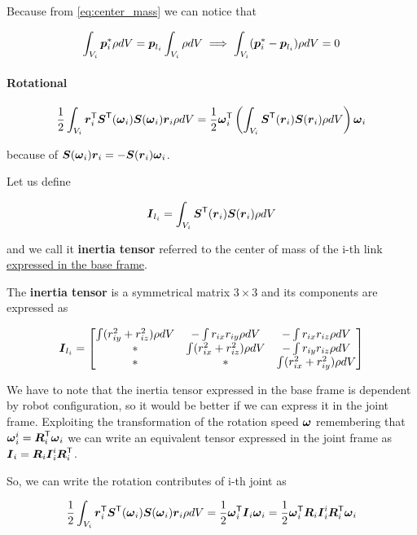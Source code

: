 Because from \autoref{eq:center_mass} we can notice that

\[
	\int_{V_i} \boldsymbol{p}_i^* \rho dV = \boldsymbol{p}_{l_i} \int_{V_i} \rho dV
	\implies
	\int_{V_i} (\boldsymbol{p}_i^* - \boldsymbol{p}_{l_i}) \rho dV = 0
\]

\paragraph{Rotational}

\[
	\frac{1}{2} \int_{V_i} \boldsymbol{r}_i^{\mathsf{T}} \boldsymbol{S}^{\mathsf{T}}(\boldsymbol{\omega}_i) \boldsymbol{S}(\boldsymbol{\omega}_i) \boldsymbol{r}_i \rho dV =
	\frac{1}{2} \boldsymbol{\omega}_i^{\mathsf{T}} \left( \int_{V_i} \boldsymbol{S}^{\mathsf{T}}(\boldsymbol{r}_i) \boldsymbol{S}(\boldsymbol{r}_i) \rho dV \right) \boldsymbol{\omega}_i
\]

because of $\boldsymbol{S}(\boldsymbol{\omega}_i) \boldsymbol{r}_i = - \boldsymbol{S}(\boldsymbol{r}_i)\boldsymbol{\omega}_i$.

Let us define

\[ \boldsymbol{I}_{l_i} = \int_{V_i} \boldsymbol{S}^{\mathsf{T}}(\boldsymbol{r}_i) \boldsymbol{S}(\boldsymbol{r}_i) \rho dV \]

and we call it \textbf{inertia tensor} referred to the center of mass of the i-th link \underline{expressed in the base frame}.

The \textbf{inertia tensor} is a symmetrical matrix $3 \times 3$ and its components are expressed as

\[
	\boldsymbol{I}_{l_i} =
	\begin{bmatrix}
		\int (r_{iy}^2 + r_{iz}^2) \rho dV & - \int r_{ix}r_{iy} \rho dV & - \int r_{ix}r_{iz} \rho dV \\
		* & \int (r_{ix}^2 + r_{iz}^2) \rho dV & - \int r_{iy}r_{iz} \rho dV \\
		* & * & \int (r_{ix}^2 + r_{iy}^2) \rho dV
	\end{bmatrix}
\]

We have to note that the inertia tensor expressed in the base frame is dependent by robot configuration, so it would be better if we can express it in the joint frame.
Exploiting the transformation of the rotation speed $\boldsymbol{\omega}$ remembering that $\boldsymbol{\omega}_i^i = \boldsymbol{R}_i^{\mathsf{T}}\boldsymbol{\omega}_i$ we can write an equivalent tensor expressed in the joint frame as $\boldsymbol{I}_i=\boldsymbol{R}_i \boldsymbol{I}_i^i \boldsymbol{R}_i^{\mathsf{T}}$.

So, we can write the rotation contributes of i-th joint as

\[
	\frac{1}{2} \int_{V_i} \boldsymbol{r}_i^{\mathsf{T}} \boldsymbol{S}^{\mathsf{T}}(\boldsymbol{\omega}_i) \boldsymbol{S}(\boldsymbol{\omega}_i) \boldsymbol{r}_i \rho dV =
	\frac{1}{2} \boldsymbol{\omega}_i^{\mathsf{T}} \boldsymbol{I}_i \boldsymbol{\omega}_i =
	\frac{1}{2} \boldsymbol{\omega}_i^{\mathsf{T}} \boldsymbol{R}_i \boldsymbol{I}_i^i \boldsymbol{R}_i^{\mathsf{T}} \boldsymbol{\omega}_i
\]


